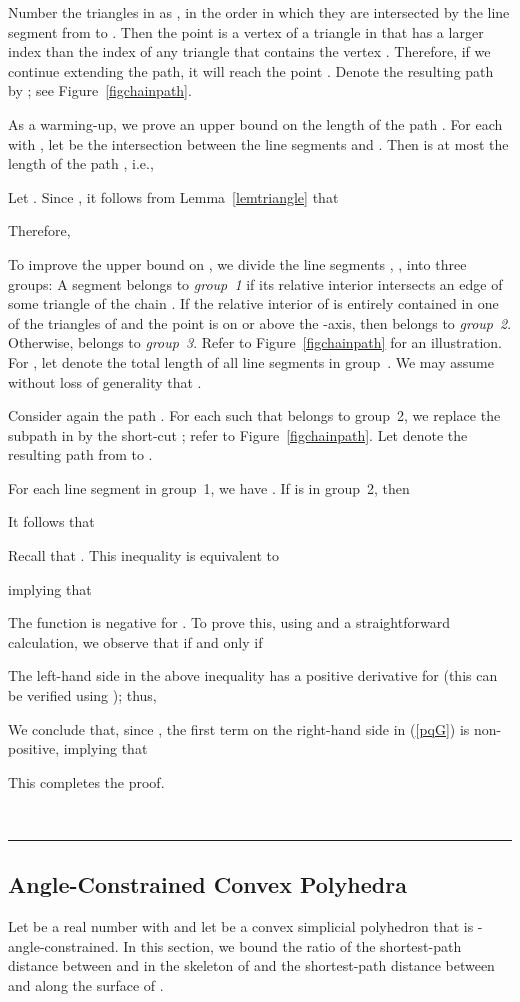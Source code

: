 \documentclass[12pt]{article}
\newcommand{\qed}{\rule{0.5em}{1.5ex}}
\newcommand{\fqed}{{\hfill~\qed}}
\newenvironment{proof}{{\noindent \bf Proof.}}
                      {{\hfill \fqed} \vspace{1em}}
\begin{document}
\begin{proof}
Number the triangles in  as , in the 
order in which they are intersected by the line segment from  to 
. Then the point  is a vertex of a triangle in  
that has a larger index than the index of any triangle that contains 
the vertex . Therefore, if we continue extending the path, it will 
reach the point . Denote the resulting path by 
; see Figure~\ref{figchainpath}. 

As a warming-up, we prove an upper bound on the length of the path .
For each  with , let  be the intersection 
between the line segments  and . Then 
 is at most the length of the path , i.e., 
  
Let . Since 
, it follows from Lemma~\ref{lemtriangle} that 
  
Therefore, 
   

To improve the upper bound on , we divide the 
line segments , , into three groups: A 
segment  belongs to \emph{group~1} if its 
relative interior intersects an edge of some triangle of the chain 
. If the relative interior of  is entirely 
contained in one of the triangles of  and the point 
 is on or above the -axis, then  belongs to 
\emph{group~2}. Otherwise,  belongs to \emph{group~3}.  
Refer to Figure~\ref{figchainpath} for an illustration.  
For , let  denote the total length of all line segments 
 in group~. We may assume without loss of generality 
that . 

Consider again the path . 
For each  such that  belongs to group~2, we replace 
the subpath  in  by the short-cut 
; refer to Figure~\ref{figchainpath}. Let  denote 
the resulting path from  to . 

For each line segment  in group~1, we have 
. If  is in group~2, then 
 
It follows that 
 
Recall that . This inequality is equivalent to 
 
implying that 
 
The function  
is negative for . To prove this, using 
 and a straightforward 
calculation, we observe that  if and only if 
 
The left-hand side in the above inequality has a positive derivative 
for  (this can be verified using 
); thus, 
 

We conclude that, since , the first term on the right-hand 
side in (\ref{pqG}) is non-positive, implying that 
 
This completes the proof.  
\end{proof} 


\subsection{Angle-Constrained Convex Polyhedra}   
Let  be a real number with  and let  be 
a convex simplicial polyhedron that is -angle-constrained. In 
this section, we bound the ratio of the shortest-path distance 
 between  and  in the skeleton of  and the 
shortest-path distance  between  and  along 
the surface of .  
\end{document}
